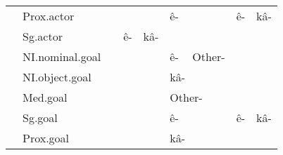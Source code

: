 \begin{table}[h!]
\begin{tabular}{@{}llllllllllll@{}}
               & Prox.actor          &                                &                                     &              &                                          & \multicolumn{3}{l}{\cellcolor[HTML]{EA9999}ê-}                                                  & \cellcolor[HTML]{EA9999}ê-      & \multicolumn{2}{l}{\cellcolor[HTML]{B6D7A8}kâ-}        \\
               & Sg.actor            &                                & \cellcolor[HTML]{EA9999}ê-       & \multicolumn{2}{l}{\cellcolor[HTML]{B6D7A8}kâ-}      &                               &                                &                                   &                                    &               &                                           \\
               & NI.nominal.goal     &                                &                                     &              &                                          & \multicolumn{2}{l}{\cellcolor[HTML]{EA9999}ê-}              & \cellcolor[HTML]{B6D7A8}Other- &                                    &               &                                           \\
               & NI.object.goal      &                                &                                     &              &                                          & \multicolumn{3}{l}{\cellcolor[HTML]{EA9999}kâ-}                                                 &                                    &               &                                           \\
               & Med.goal            &                                &                                     &              &                                          & \multicolumn{3}{l}{\cellcolor[HTML]{B6D7A8}Other-}                                              &                                    &               &                                           \\
               & Sg.goal             &                                &                                     &              &                                          & \multicolumn{3}{l}{\cellcolor[HTML]{EA9999}ê-}                                                  & \cellcolor[HTML]{EA9999}ê-      & \multicolumn{2}{l}{\cellcolor[HTML]{B6D7A8}kâ-}        \\
               & Prox.goal           &                                &                                     &              &                                          & \multicolumn{3}{l}{\cellcolor[HTML]{EA9999}kâ-}                                                 &                                    &               &                                           \\

\end{tabular}
\end{table}
